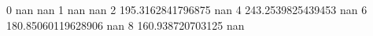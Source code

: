 0 nan nan
1 nan nan
2 195.3162841796875 nan
4 243.2539825439453 nan
6 180.85060119628906 nan
8 160.938720703125 nan
